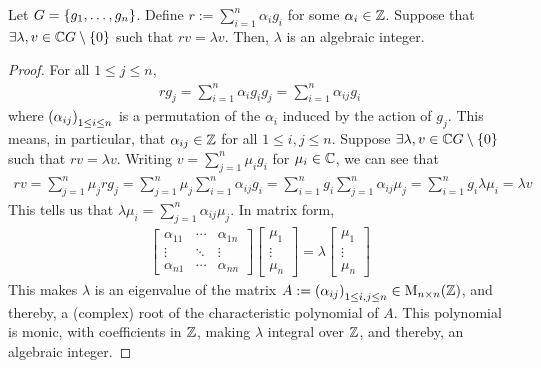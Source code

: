 \begin{lemma}\label{Ch2:Lem:Alg_Int_Eigen}
    Let $G = \left\{ g_1, \ldots, g_n \right\}$. Define $r := \sum_{i=1}^{n} \alpha_i g_i$ for some $\alpha_i \in \mathbb{Z}$. Suppose that $\exists \lambda, v \in \mathbb{C} G \setminus \left\{ 0 \right\}$ such that $rv = \lambda v$. Then, $\lambda$ is an algebraic integer.
\end{lemma}
\begin{proof}
    For all $1 \leq j \leq n$,
    \begin{align*}
        r g_j = \sum_{i=1}^{n} \alpha_{i} g_i g_j = \sum_{i=1}^{n} \alpha_{ij} g_i
    \end{align*}
    where $\left( \alpha_{ij} \right)_{1 \leq i \leq n}$ is a permutation of the $\alpha_i$ induced by the action of $g_j$. This means, in particular, that $\alpha_{ij} \in \mathbb{Z}$ for all $1 \leq i,j \leq n$. Suppose $\exists \lambda, v \in \mathbb{C} G \setminus \left\{ 0 \right\}$ such that $rv = \lambda v$. Writing $v = \sum_{j=1}^{n} \mu_i g_i$ for $\mu_i \in \mathbb{C}$, we can see that
    \begin{align*}
        rv = \sum_{j=1}^{n} \mu_j r g_j = \sum_{j=1}^{n} \mu_j \sum_{i=1}^{n} \alpha_{ij} g_i = \sum_{i=1}^{n} g_i \sum_{j=1}^{n} \alpha_{ij} \mu_j = \sum_{i=1}^{n} g_i \lambda \mu_i = \lambda v
    \end{align*}
    This tells us that $\lambda \mu_i = \sum_{j=1}^{n} \alpha_{ij} \mu_j$. In matrix form,
    \begin{align*}
        \begin{bmatrix}
            \alpha_{11} & \cdots & \alpha_{1n} \\
            \vdots & \ddots & \vdots \\
            \alpha_{n1} & \cdots & \alpha_{nn}
        \end{bmatrix}
        \begin{bmatrix}
            \mu_1 \\ \vdots \\ \mu_n
        \end{bmatrix}
        = \lambda
        \begin{bmatrix}
            \mu_1 \\ \vdots \\ \mu_n
        \end{bmatrix}
    \end{align*}
    This makes $\lambda$ is an eigenvalue of the matrix $A := \left( \alpha_{ij} \right)_{1 \leq i,j \leq n} \in \operatorname{M}_{{n} \times {n}}\!\left( {\mathbb{Z}} \right)$, and thereby, a (complex) root of the characteristic polynomial of $A$. This polynomial is monic, with coefficients in $\mathbb{Z}$, making $\lambda$ integral over $\mathbb{Z}$, and thereby, an algebraic integer.
\end{proof}

